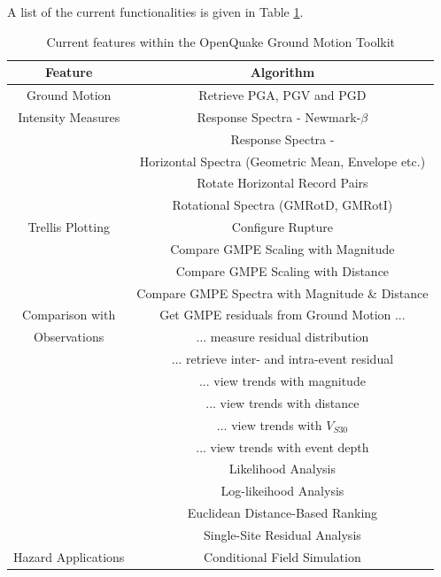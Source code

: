 A list of the current functionalities is given in Table \ref{tab:features}.

\begin{table}
\centering
\begin{tabular}{|c|c|} \hline
\textbf{Feature} & \textbf{Algorithm} \\ \hline
Ground Motion  &  Retrieve PGA, PGV and PGD \\
Intensity Measures  &  Response Spectra - Newmark-$\beta$ \\
  &   Response Spectra - \textcite{NigamJennings1969} \\
  &   Horizontal Spectra (Geometric Mean, Envelope etc.) \\
  &   Rotate Horizontal Record Pairs \\
  &   Rotational Spectra (GMRotD, GMRotI) \parencite{Boore_etal2006} \\ \hline
Trellis Plotting & Configure Rupture \\
                 & Compare GMPE Scaling with Magnitude \\
                 & Compare GMPE Scaling with Distance \\
                 & Compare GMPE Spectra with Magnitude \& Distance \\ \hline
Comparison with  & Get GMPE residuals from Ground Motion ... \\
Observations     & ... measure residual distribution \\
                 & ... retrieve inter- and intra-event residual \\
                 & ... view trends with magnitude \\
                 & ... view trends with distance \\
                 & ... view trends with $V_{S30}$ \\
                 & ... view trends with event depth \\
                 & Likelihood Analysis \parencite{Scherbaum_etal2004}\\
                 & Log-likeihood Analysis \parencite{Scherbaum_etal2009}\\
                 & Euclidean Distance-Based Ranking \parencite{KaleAkkar2013}\\
                 & Single-Site Residual Analysis \\ \hline
Hazard Applications & Conditional Field Simulation \\ \hline
\end{tabular}
\caption{Current features within the OpenQuake Ground Motion Toolkit}
\label{tab:features}

\end{table}


